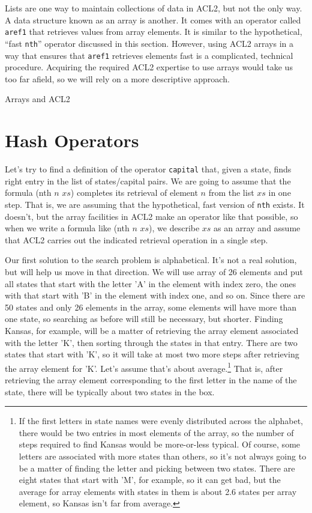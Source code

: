 \begin{aside}
Lists are one way to maintain collections of data in ACL2,
but not the only way. A data structure
known as an array is another. It comes with an operator
called \texttt{aref1} that retrieves values from array elements.
It is similar to the hypothetical, ``fast \texttt{nth}'' operator
discussed in this section. However, using ACL2 arrays in a way that
ensures that \texttt{aref1} retrieves elements fast
is a complicated, technical procedure.
Acquiring the required ACL2 expertise to use arrays
would take us too far afield, so we will rely on a
more descriptive approach.
\caption{Arrays and ACL2}
\end{aside}

\section{Hash Operators}

Let's try to find a definition of the operator
\texttt{capital} that, given a state, finds right entry
in the list of states/capital pairs.
We are going to assume that the formula (nth $n$ $xs$)
completes its retrieval of element $n$ from the list $xs$
in one step. That is, we are assuming that the hypothetical,
fast version of \texttt{nth} exists. It doesn't, but the
array facilities in ACL2 make an operator like that possible,
so when we write a formula like (nth $n$ $xs$), we describe
$xs$ as an array and assume that ACL2 carries out
the indicated retrieval operation in a single step.

Our first solution to the search problem is alphabetical.
It's not a real solution, but will help us move in that direction.
We will use array of 26 elements
and put all states that start with the letter 'A' in
the element with index zero,
the ones with that start with 'B' in the element with index one, and so on.
Since there are 50 states and only
26 elements in the array, some elements will have more than one state,
so searching as before will still be necessary, but shorter.
Finding Kansas, for example, will be
a matter of retrieving the array element associated with
the letter 'K', then sorting through the states in that entry.
There are two states that start with 'K',
so it will take at most two more steps after retrieving
the array element for 'K'.  Let's assume that's about
average.\footnote{If the first letters in state names
were evenly distributed across the alphabet, there would be
two entries in most elements of the array, so the number of steps
required to find Kansas would be more-or-less typical.
Of course, some letters are associated with more states than
others, so it's not always going to be a matter of finding
the letter and picking between two states. There are eight
states that start with 'M', for example, so it can get bad,
but the average for array elements with states in them
is about 2.6 states per array element, so
Kansas isn't far from average.}
That is, after retrieving the array element corresponding to
the first letter in the name of the state, there will
be typically about two states in the box.

